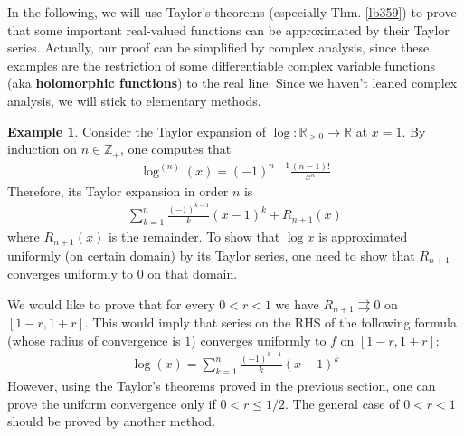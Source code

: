 \documentclass[12pt,b5paper,notitlepage]{article}
\theoremstyle{definition}
\newtheorem{eg}[df]{Example}
\theoremstyle{plain}
\newcommand{\Zbb}{\mathbb Z}
\newcommand{\Rbb}{\mathbb R}
\numberwithin{equation}{section}
\begin{document}
In the following, we will use Taylor's theorems (especially Thm. \ref{lb359}) to prove that some important real-valued functions can be approximated by their Taylor series. Actually, our proof can be simplified by complex analysis, since these examples are the restriction of some differentiable complex variable functions (aka \textbf{holomorphic functions}) to the real line. Since we haven't leaned complex analysis, we will stick to elementary methods. 


\begin{eg}
Consider the Taylor expansion of $\log:\Rbb_{>0}\rightarrow\Rbb$ at $x=1$. By induction on $n\in\Zbb_+$, one computes that
\begin{align*}
\log^{(n)}(x)=(-1)^{n-1}\frac{(n-1)!}{x^n}
\end{align*}
Therefore, its Taylor expansion in order $n$ is
\begin{align*}
\sum_{k=1}^n \frac{(-1)^{k-1}}{k} (x-1)^k+R_{n+1}(x)
\end{align*}
where $R_{n+1}(x)$ is the remainder. To show that $\log x$ is approximated uniformly (on certain domain) by its Taylor series, one need to show that $R_{n+1}$ converges uniformly to $0$ on that domain. 

We would like to prove that for every $0<r<1$ we have $R_{n+1}\rightrightarrows 0$ on $[1-r,1+r]$. This would imply that series on the RHS of the following formula (whose radius of convergence is $1$) converges uniformly to $f$ on $[1-r,1+r]$:
\begin{align}
\log(x)=\sum_{k=1}^n \frac{(-1)^{k-1}}{k} (x-1)^k
\end{align}
However, using the Taylor's theorems proved in the previous section, one can prove the uniform convergence only if $0<r\leq1/2$. The general case of $0<r<1$ should be proved by another method.   \hfill\qedsymbol
\end{eg}
\end{document}
